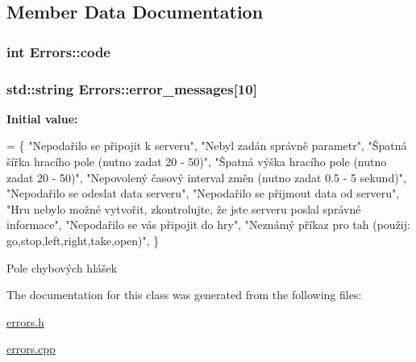 \subsection{Member Data Documentation}
\hypertarget{classErrors_ab886b164554b2094ff8263917cfcaaae}{
\subsubsection[{code}]{\setlength{\rightskip}{0pt plus 5cm}int Errors\-::code}}\label{classErrors_ab886b164554b2094ff8263917cfcaaae}
\hypertarget{classErrors_abce2313e24596b78f074bc3a31ae5dab}{
\subsubsection[{error\-\_\-messages}]{\setlength{\rightskip}{0pt plus 5cm}std\-::string Errors\-::error\-\_\-messages\mbox{[}10\mbox{]}}}\label{classErrors_abce2313e24596b78f074bc3a31ae5dab}
{\bfseries Initial value\-:}
\begin{DoxyCode}
=
    \{
        \textcolor{stringliteral}{"Nepodařilo se připojit k serveru"},
        \textcolor{stringliteral}{"Nebyl zadán správně parametr"},
        \textcolor{stringliteral}{"Špatná šířka hracího pole (nutno zadat 20 - 50)"},
        \textcolor{stringliteral}{"Špatná výška hracího pole (nutno zadat 20 - 50)"},
        \textcolor{stringliteral}{"Nepovolený časový interval změn (nutno zadat 0.5 - 5 sekund)"},
        \textcolor{stringliteral}{"Nepodařilo se odeslat data serveru"},   
        \textcolor{stringliteral}{"Nepodařilo se přijmout data od serveru"},
        \textcolor{stringliteral}{"Hru nebylo možné vytvořit, zkontrolujte, že jste serveru poslal správné informace"},
        \textcolor{stringliteral}{"Nepodařilo se vás připojit do hry"},
        \textcolor{stringliteral}{"Neznámý příkaz pro tah (použij: go,stop,left,right,take,open)"},
    \}
\end{DoxyCode}
Pole chybových hlášek 

The documentation for this class was generated from the following files\-:\begin{DoxyCompactItemize}
\item 
\hyperlink{errors_8h}{errors.\-h}\item 
\hyperlink{errors_8cpp}{errors.\-cpp}\end{DoxyCompactItemize}
